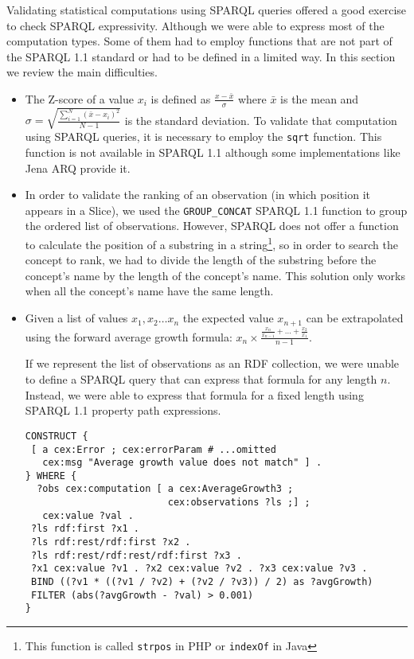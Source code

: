 Validating statistical computations using SPARQL queries offered 
 a good exercise to check SPARQL expressivity. Although we were able 
 to express most of the computation types. 
Some of them had to employ functions that are not part of the SPARQL 1.1
standard or had to be defined in a limited way. In this section we review 
the main difficulties.

\begin{itemize} 

\item The Z-score of a value $x_i$ is defined as $\frac{x - \bar{x}}{\sigma}$
where $\bar{x}$ is the mean and $\sigma=\sqrt{\frac{\sum_{i=1}^{N}(\bar{x}-x_i)^2}{N -
1}}$ is the standard deviation. To validate that computation using SPARQL
queries, it is necessary to employ the \lstinline|sqrt| function. 
This function is not available in SPARQL 1.1 although some implementations 
 like Jena
 ARQ 
 provide it.

\item In order to validate the ranking of an observation (in which position it
appears in a Slice), we used the \lstinline|GROUP_CONCAT| SPARQL 1.1
function to group the ordered list of observations. However, SPARQL 
 does not offer a function to calculate the position of a substring in a
 string\footnote{This function is called \lstinline|strpos|
 in PHP or \lstinline|indexOf| in Java}, so in order to search the concept to
 rank, we had to divide the length of the substring before 
 the concept's name by the length of the concept's
 name. This solution only works when all the concept's name have the same
 length.

\item Given a list of values $x_1,x_2\ldots{}x_n$ the expected value
$x_{n+1}$ can be extrapolated using the forward average growth formula: 
$x_n\times{\frac{\frac{x_{n}}{x_{n-1}}+\ldots{}+\frac{x_{2}}{x_1}}{n-1}}$. 

If we represent the list of observations as an RDF collection, we were unable to
define a SPARQL query that can express that formula for any length $n$.
Instead, we were able to express that formula for a fixed length using SPARQL
1.1 property path expressions. 

\begin{lstlisting}[style=SPARQL]
CONSTRUCT {
 [ a cex:Error ; cex:errorParam # ...omitted
   cex:msg "Average growth value does not match" ] .
} WHERE { 
  ?obs cex:computation [ a cex:AverageGrowth3 ;
	                     cex:observations ?ls ;] ;
   cex:value ?val .
 ?ls rdf:first ?x1 .
 ?ls rdf:rest/rdf:first ?x2 .
 ?ls rdf:rest/rdf:rest/rdf:first ?x3 .
 ?x1 cex:value ?v1 . ?x2 cex:value ?v2 . ?x3 cex:value ?v3 .
 BIND ((?v1 * ((?v1 / ?v2) + (?v2 / ?v3)) / 2) as ?avgGrowth)
 FILTER (abs(?avgGrowth - ?val) > 0.001)
}
\end{lstlisting}

\end{itemize}
